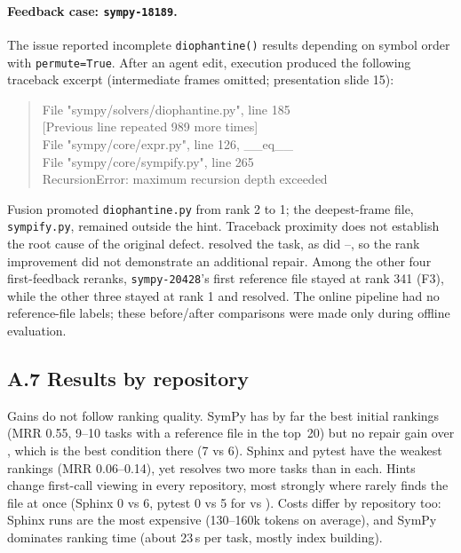 \paragraph{Feedback case: \texttt{sympy-18189}.}
The issue reported incomplete \texttt{diophantine()} results depending on symbol order
with \texttt{permute=True}. After an agent edit, execution produced the following
traceback excerpt (intermediate frames omitted; presentation slide 15):
\begin{quote}\small\ttfamily\raggedright
File "sympy/solvers/diophantine.py", line 185\\
\hspace*{1em}[Previous line repeated 989 more times]\\
File "sympy/core/expr.py", line 126, \_\_eq\_\_\\
File "sympy/core/sympify.py", line 265\\
RecursionError: maximum recursion depth exceeded
\end{quote}
Fusion promoted \texttt{diophantine.py} from rank 2 to 1; the deepest-frame file,
\texttt{sympify.py}, remained outside the hint. Traceback proximity does not establish
the root cause of the original defect.
\condD{} resolved the task, as did \condA{}--\condC{}, so the rank improvement did not
demonstrate an additional repair. Among the other four first-feedback reranks,
\texttt{sympy-20428}'s first reference file stayed at rank 341 (F3), while the other three
stayed at rank 1 and resolved. The online pipeline had no reference-file labels; these
before/after comparisons were made only during offline evaluation.

\subsection*{A.7 Results by repository}
Gains do not follow ranking quality. SymPy has by far the best initial rankings
(MRR 0.55, 9--10 tasks with a reference file in the top~20) but no repair gain over \condA{}, which is
the best condition there (7 vs 6). Sphinx and pytest have the weakest rankings (MRR 0.06--0.14), yet
\condC{} resolves two more tasks than \condA{} in each. Hints change first-call viewing in every
repository, most strongly where \condA{} rarely finds the file at once (Sphinx 0 vs 6, pytest 0 vs 5 for
\condA{} vs \condC). Costs differ by repository too: Sphinx runs are the most expensive (130--160k tokens
on average), and SymPy dominates ranking time (about 23\,s per task, mostly index building).

